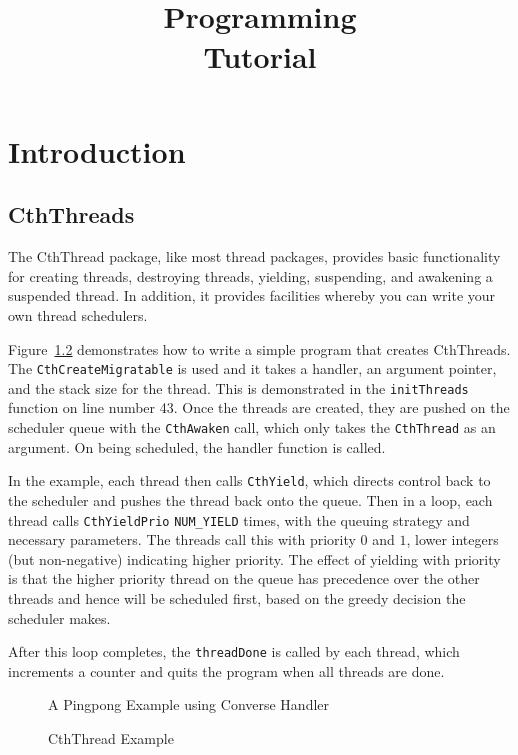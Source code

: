 \documentclass[10pt]{report}
\title{\converse{}\\Programming\\Tutorial}
\begin{document}
\maketitle

\chapter{Introduction}

\section{CthThreads}

The CthThread package, like most thread packages, provides basic functionality
for creating threads, destroying threads, yielding, suspending, and awakening a
suspended thread. In addition, it provides facilities whereby you can write
your own thread schedulers.

Figure~\ref{fig:converse-cth} demonstrates how to write a simple program that
creates CthThreads. The \texttt{CthCreateMigratable} is used and it takes a
handler, an argument pointer, and the stack size for the thread. This is
demonstrated in the \texttt{initThreads} function on line number 43. Once the
threads are created, they are pushed on the scheduler queue with the
\texttt{CthAwaken} call, which only takes the \texttt{CthThread} as an
argument. On being scheduled, the handler function is called.

In the example, each thread then calls \texttt{CthYield}, which directs control
back to the scheduler and pushes the thread back onto the queue. Then in a
loop, each thread calls \texttt{CthYieldPrio} \texttt{NUM\_YIELD} times, with
the queuing strategy and necessary parameters. The threads call this with
priority $0$ and $1$, lower integers (but non-negative) indicating higher
priority. The effect of yielding with priority is that the higher priority
thread on the queue has precedence over the other threads and hence will be
scheduled first, based on the greedy decision the scheduler makes.

After this loop completes, the \texttt{threadDone} is called by each
thread, which increments a counter and quits the program when all threads are
done.

\begin{figure}

\caption{A Pingpong Example using Converse Handler}
\label{fig:converse-pingpong}
\end{figure}

\begin{figure}
 \caption{CthThread Example}
 \label{fig:converse-cth}
\end{figure}
\end{document}
